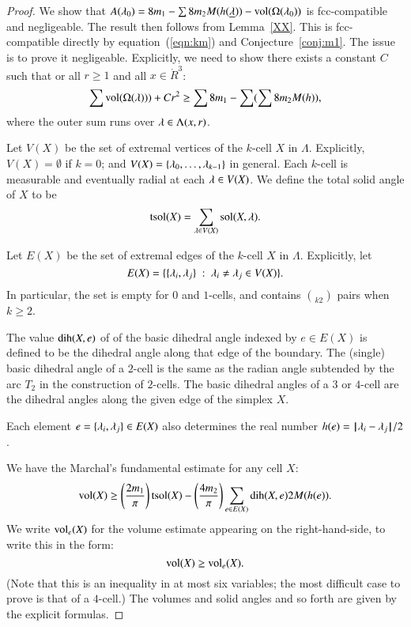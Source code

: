 \begin{proof} 
We show that $A(\lambda_0)  = 8 m_1 - \sum 8 m_2 M(h({\underline{\lambda}})) -{\operatorname{vol}}(\Omega(\lambda_0))$ is fcc-compatible and negligeable.  The
result then follows from Lemma~\ref{XX}.  
This is fcc-compatible directly
by equation~(\ref{eqn:km})
and Conjecture~\ref{conj:m1}.  The issue is to prove it negligeable.  Explicitly, we need
to show there exists a constant  $C$ such that or all $r\ge 1$ and all $x\in\ring{R}^3$:
\begin{equation}\label{eqn:neg}
  \sum {\operatorname{vol}}(\Omega(\lambda))) + C r^2 \ge \sum 8m_1 - \sum (\sum 8 m_2 M(h)),
\end{equation}
where the outer sum runs over $\lambda\in \Lambda(x,r)$.


Let $V(X)$ be the set of extremal vertices of the $k$-cell $X$ in $\Lambda$.  Explicitly, $V(X)=\emptyset$ if $k=0$; and $V(X) = \{\lambda_0,\ldots,\lambda_{k-1}\}$ in general.  Each $k$-cell is measurable and eventually
radial at each $\lambda\in V(X)$.  We define the total solid angle of $X$ to be
$$
{\operatorname{tsol}}(X) = \sum_{\lambda\in V(X)} \operatorname{sol}(X,\lambda).
$$

Let $E(X)$ be the set of extremal edges of the $k$-cell $X$ in $\Lambda$.  Explicitly, let 
$$E(X)=\{\{\lambda_i,\lambda_j\}\ :\  \lambda_i\ne\lambda_j\in V(X)\}.$$
In particular, the set is empty for $0$ and $1$-cells, and contains
$\choose{k}{2}$ pairs when $k\ge 2$.


The value
$\operatorname{dih}(X,e)$ of
of the basic dihedral angle indexed by $e\in E(X)$ is defined to be the dihedral angle along that edge
of the boundary.  
The (single) basic  dihedral angle of a $2$-cell is
the same as the radian angle subtended by the arc $T_2$ in the construction of $2$-cells.
The basic dihedral angles of a $3$ or $4$-cell are the dihedral angles along the given edge of the simplex $X$. 

Each element $e=\{\lambda_i,\lambda_j\}\in E(X)$ also determines
the real number $h(e) = {\hskip0.1em|\hskip-0.15em|\hskip0.1em}\lambda_i - \lambda_j{\hskip0.1em|\hskip-0.15em|\hskip0.1em}/2$.

We have the Marchal's fundamental estimate for any cell $X$:
\begin{equation}\label{eqn:mfe}
{\operatorname{vol}}(X) \ge \left(\frac{2m_1}{\pi}\right) {\operatorname{tsol}}(X) - \left(\frac{4m_2}{\pi}\right)
\sum_{e\in E(X)} \operatorname{dih}(X,e) 2 M(h(e)).
\end{equation}
We write ${\operatorname{vol}}_e(X)$ for the volume estimate appearing on the 
right-hand-side, to write this in the form:
\begin{equation}\label{eqn:vole}
{\operatorname{vol}}(X) \ge {\operatorname{vol}}_e(X).
\end{equation}
(Note that this is an inequality in at most six variables; the most difficult case to prove
is that of a $4$-cell.)  The volumes and solid angles and so forth are given by the 
explicit formulas.


\end{proof}
